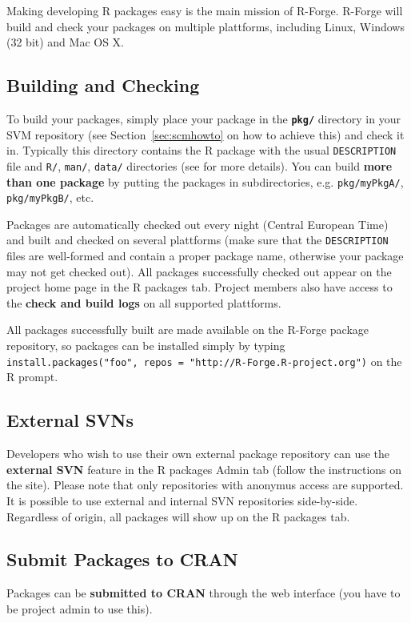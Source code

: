 \documentclass[a4paper]{report}
\newcommand{\proglang}[1]{\textsf{#1}}
\begin{document}
Making developing R packages easy is the main mission of
R-Forge. R-Forge will build and check your packages on multiple
plattforms, including Linux, Windows (32 bit) and Mac OS X. 

\subsection{Building and Checking}
To build your packages, simply place your package in the
\textbf{\texttt{pkg/}} directory in your SVM repository (see 
Section~\ref{sec:scmhowto} on how to achieve this) and check it
in. Typically this directory contains the R package with the usual
\texttt{DESCRIPTION} file and \texttt{R/}, \texttt{man/},
\texttt{data/} directories (see \cite{Rcore:writing_R_extensions} for more
details). You can build \textbf{more than one package} by putting the
packages in subdirectories, e.g. \texttt{pkg/myPkgA/}, 
\texttt{pkg/myPkgB/}, etc.

Packages are automatically checked out every night (Central European
Time) and built and checked on several plattforms (make sure that the
\texttt{DESCRIPTION} files are well-formed and contain a proper 
package name, otherwise your package may not get checked out). All packages successfully checked out appear on the project home page in the R packages tab. Project members also have access to the \textbf{check and build logs} on all supported plattforms. 

All packages successfully built are made available on the
R-Forge package repository, so packages can be installed simply by
typing \texttt{install.packages("foo", repos = "http://R-Forge.R-project.org")}
on the \proglang{R} prompt. 

\subsection{External SVNs}
Developers who wish to use their own external package repository can
use the \textbf{external SVN} feature in the R packages Admin tab
(follow the instructions on the site). Please note that only
repositories with anonymus access are supported. It is possible to use
external and internal SVN repositories side-by-side. Regardless of
origin, all packages will show up on the R packages tab. 

\subsection{Submit Packages to CRAN}
Packages can be \textbf{submitted to CRAN} through the web interface
(you have to be project admin to use this). 
\end{document}
